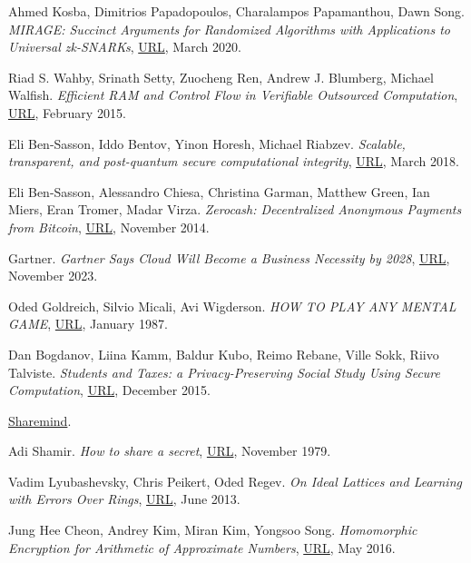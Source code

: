 \documentclass{Resources/UoBLab1}
\theoremstyle{definition}
\begin{document}
\begin{thebibliography}{10}
 Ahmed Kosba, Dimitrios Papadopoulos, Charalampos Papamanthou, Dawn Song. \textit{MIRAGE: Succinct Arguments for Randomized Algorithms with Applications to Universal zk-SNARKs}, \href{https://eprint.iacr.org/2020/278.pdf}{URL}, March 2020.

 Riad S. Wahby, Srinath Setty, Zuocheng Ren, Andrew J. Blumberg, Michael Walfish. \textit{Efficient RAM and Control Flow in Verifiable Outsourced Computation}, \href{https://www.ndss-symposium.org/wp-content/uploads/2017/09/07_3_2.pdf}{URL}, February 2015.

 Eli Ben-Sasson, Iddo Bentov, Yinon Horesh, Michael Riabzev. \textit{Scalable, transparent, and post-quantum secure computational integrity}, \href{https://eprint.iacr.org/2018/046.pdf}{URL}, March 2018.

 Eli Ben-Sasson, Alessandro Chiesa, Christina Garman, Matthew Green, Ian Miers, Eran Tromer, Madar Virza. \textit{Zerocash: Decentralized Anonymous Payments from Bitcoin}, \href{https://ieeexplore.ieee.org/stamp/stamp.jsp?tp=&arnumber=6956581}{URL}, November 2014.

 Gartner. \textit{Gartner Says Cloud Will Become a Business Necessity by 2028}, \href{https://www.gartner.com/en/newsroom/press-releases/2023-11-29-gartner-says-cloud-will-become-a-business-necessity-by-2028}{URL}, November 2023.

 Oded Goldreich, Silvio Micali, Avi Wigderson. \textit{HOW TO PLAY ANY MENTAL GAME}, \href{https://dl.acm.org/doi/pdf/10.1145/28395.28420}{URL}, January 1987.

 Dan Bogdanov, Liina Kamm, Baldur Kubo, Reimo Rebane, Ville Sokk, Riivo Talviste. \textit{Students and Taxes: a Privacy-Preserving Social Study Using Secure Computation}, \href{https://eprint.iacr.org/2015/1159.pdf}{URL}, December 2015.

 \href{https://sharemind.cyber.ee}{Sharemind}.

 Adi Shamir. \textit{How to share a secret}, \href{https://dl.acm.org/doi/pdf/10.1145/359168.359176}{URL}, November 1979.

 Vadim Lyubashevsky, Chris Peikert, Oded Regev. \textit{On Ideal Lattices and Learning with Errors Over Rings}, \href{https://eprint.iacr.org/2012/230.pdf}{URL}, June 2013.

 Jung Hee Cheon, Andrey Kim, Miran Kim, Yongsoo Song. \textit{Homomorphic Encryption for Arithmetic of Approximate Numbers}, \href{https://eprint.iacr.org/2016/421.pdf}{URL}, May 2016.


\end{thebibliography}
\end{document}
